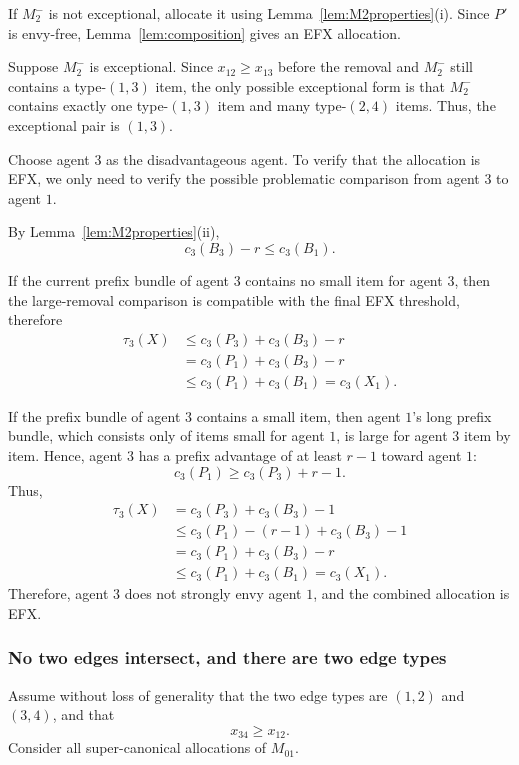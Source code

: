 \documentclass{article}
\theoremstyle{definition}
\begin{document}
If $M_2^-$ is not exceptional, allocate it using
Lemma~\ref{lem:M2properties}(i).  Since $P'$ is envy-free, Lemma~\ref{lem:composition}
gives an EFX allocation.

Suppose $M_2^-$ is exceptional.  Since $x_{12}\ge x_{13}$ before the removal
and $M_2^-$ still contains a type-$(1,3)$ item, the only possible exceptional
form is that $M_2^-$ contains exactly one type-$(1,3)$ item and many
type-$(2,4)$ items.  Thus, the exceptional pair is $(1,3)$.

Choose agent $3$ as the disadvantageous agent.  To verify that the allocation is EFX, we only need to verify the
possible problematic comparison from agent $3$ to agent $1$.

By Lemma~\ref{lem:M2properties}(ii),
\[
    c_3(B_3)-r\le c_3(B_1).
\]

If the current prefix bundle of agent $3$ contains no small item for agent
$3$, then the large-removal comparison is compatible with the final EFX
threshold, therefore
\[
\begin{aligned}
    \tau_3(X)
    &\le c_3(P_3)+c_3(B_3)-r \\
    &= c_3(P_1)+c_3(B_3)-r \\
    &\le c_3(P_1)+c_3(B_1)
    = c_3(X_1).
\end{aligned}
\]

If the prefix bundle of agent $3$ contains a small item, then agent $1$'s
long prefix bundle, which consists only of items small for agent $1$, is large
for agent $3$ item by item.  Hence, agent $3$ has a prefix advantage of at
least $r-1$ toward agent $1$:
\[
    c_3(P_1)\ge c_3(P_3)+r-1.
\]
Thus,
\[
\begin{aligned}
    \tau_3(X)
    &=c_3(P_3)+c_3(B_3)-1 \\
    &\le c_3(P_1)-(r-1)+c_3(B_3)-1 \\
    &=c_3(P_1)+c_3(B_3)-r \\
    &\le c_3(P_1)+c_3(B_1)
    =c_3(X_1).
\end{aligned}
\]
Therefore, agent $3$ does not strongly envy agent $1$, and the combined
allocation is EFX.

\subsubsection{No two edges intersect, and there are two edge types}

Assume without loss of generality that the two edge types are $(1,2)$ and
$(3,4)$, and that
\[
    x_{34}\ge x_{12}.
\]
Consider all super-canonical allocations of $M_{01}$.
\end{document}
